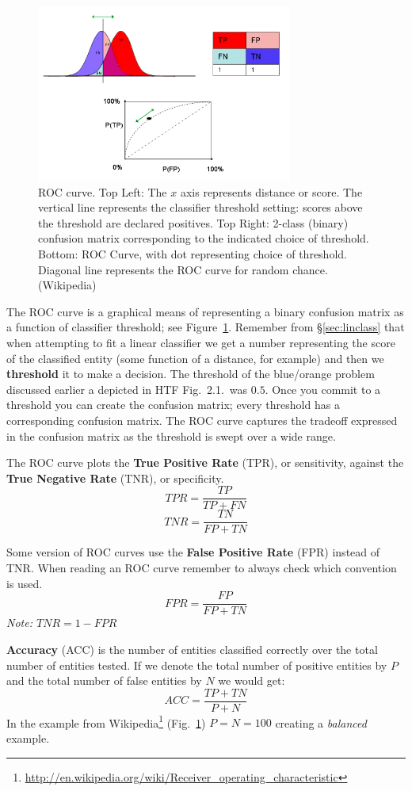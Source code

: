 \documentclass[a4paper]{article}
\begin{document}
\begin{figure}
\centering
\includegraphics[width=0.75\textwidth]{WikipediaROC.png}
\caption{\label{wikipedia_roc}ROC curve. Top Left: The $x$ axis represents distance or score.  The vertical line represents the classifier threshold setting: scores above the threshold are declared positives. Top Right: 2-class (binary) confusion matrix corresponding to the indicated choice of threshold. Bottom: ROC Curve, with dot representing choice of threshold. Diagonal line represents the ROC curve for random chance.  (Wikipedia)}
\end{figure}

The ROC curve is a graphical means of representing a binary confusion matrix as a function of classifier threshold; see Figure~\ref{wikipedia_roc}. Remember from \S \ref{sec:linclass} that when attempting to fit a linear classifier we get a number representing the score of the classified entity (some function of a distance, for example) and then we \textbf{threshold} it to make a decision. The threshold of the blue/orange problem discussed earlier a depicted in HTF Fig.\ 2.1.\ was $0.5$. Once you commit to a threshold you can create the confusion matrix; every threshold has a corresponding confusion matrix. The ROC curve captures the tradeoff expressed in the confusion matrix as the threshold is swept over a wide range.

The ROC curve plots the \textbf{True Positive Rate} (TPR), or sensitivity, against the \textbf{True Negative Rate} (TNR), or specificity.
$$TPR = \frac{TP}{TP + FN}$$
$$TNR = \frac{TN}{FP + TN}$$

Some version of ROC curves use the \textbf{False Positive Rate} (FPR) instead of TNR. When reading an ROC curve remember to always check which convention is used.
$$FPR = \frac{FP}{FP + TN}$$
\textit{Note: $TNR = 1-FPR$}

\textbf{Accuracy} (ACC) is the number of entities classified correctly over the total number of entities tested. If we denote the total number of positive entities by $P$ and the total number of false entities by $N$ we would get:
$$ACC = \frac{TP+TN}{P+N}$$
In the example from Wikipedia\footnote{\url{http://en.wikipedia.org/wiki/Receiver_operating_characteristic}} (Fig.\ \ref{wikipedia_roc}) $P = N = 100$ creating a \textit{balanced} example.\\
\end{document}
